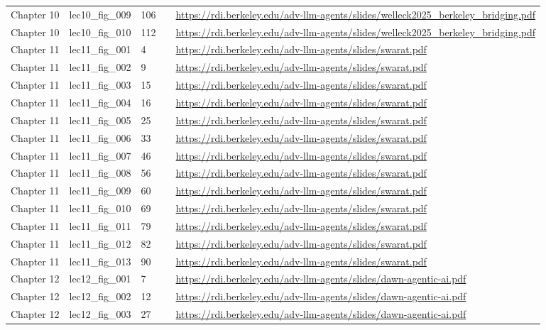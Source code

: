 \begin{longtable}{p{}p{}p{}p{}p{}}
Chapter 10 & lec10\_fig\_009 & 106 &  & \url{https://rdi.berkeley.edu/adv-llm-agents/slides/welleck2025_berkeley_bridging.pdf} \\
Chapter 10 & lec10\_fig\_010 & 112 &  & \url{https://rdi.berkeley.edu/adv-llm-agents/slides/welleck2025_berkeley_bridging.pdf} \\
Chapter 11 & lec11\_fig\_001 & 4 &  & \url{https://rdi.berkeley.edu/adv-llm-agents/slides/swarat.pdf} \\
Chapter 11 & lec11\_fig\_002 & 9 &  & \url{https://rdi.berkeley.edu/adv-llm-agents/slides/swarat.pdf} \\
Chapter 11 & lec11\_fig\_003 & 15 &  & \url{https://rdi.berkeley.edu/adv-llm-agents/slides/swarat.pdf} \\
Chapter 11 & lec11\_fig\_004 & 16 &  & \url{https://rdi.berkeley.edu/adv-llm-agents/slides/swarat.pdf} \\
Chapter 11 & lec11\_fig\_005 & 25 &  & \url{https://rdi.berkeley.edu/adv-llm-agents/slides/swarat.pdf} \\
Chapter 11 & lec11\_fig\_006 & 33 &  & \url{https://rdi.berkeley.edu/adv-llm-agents/slides/swarat.pdf} \\
Chapter 11 & lec11\_fig\_007 & 46 &  & \url{https://rdi.berkeley.edu/adv-llm-agents/slides/swarat.pdf} \\
Chapter 11 & lec11\_fig\_008 & 56 &  & \url{https://rdi.berkeley.edu/adv-llm-agents/slides/swarat.pdf} \\
Chapter 11 & lec11\_fig\_009 & 60 &  & \url{https://rdi.berkeley.edu/adv-llm-agents/slides/swarat.pdf} \\
Chapter 11 & lec11\_fig\_010 & 69 &  & \url{https://rdi.berkeley.edu/adv-llm-agents/slides/swarat.pdf} \\
Chapter 11 & lec11\_fig\_011 & 79 &  & \url{https://rdi.berkeley.edu/adv-llm-agents/slides/swarat.pdf} \\
Chapter 11 & lec11\_fig\_012 & 82 &  & \url{https://rdi.berkeley.edu/adv-llm-agents/slides/swarat.pdf} \\
Chapter 11 & lec11\_fig\_013 & 90 &  & \url{https://rdi.berkeley.edu/adv-llm-agents/slides/swarat.pdf} \\
Chapter 12 & lec12\_fig\_001 & 7 &  & \url{https://rdi.berkeley.edu/adv-llm-agents/slides/dawn-agentic-ai.pdf} \\
Chapter 12 & lec12\_fig\_002 & 12 &  & \url{https://rdi.berkeley.edu/adv-llm-agents/slides/dawn-agentic-ai.pdf} \\
Chapter 12 & lec12\_fig\_003 & 27 &  & \url{https://rdi.berkeley.edu/adv-llm-agents/slides/dawn-agentic-ai.pdf} \\

\end{longtable}
